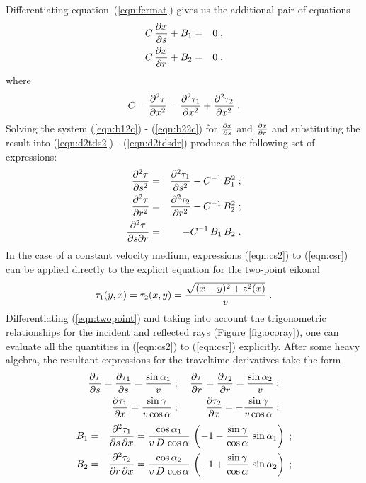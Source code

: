 Differentiating equation~(\ref{eqn:fermat}) gives us the additional
pair of equations
\begin{eqnarray}
C\,{\partial x \over \partial s}+B_1  & = & 0\;,
\label{eqn:b12c} \\
C\,{\partial x \over \partial r}+B_2  & = & 0\;,
\label{eqn:b22c}
\end{eqnarray}
where
\[
C={\partial^2 \tau \over \partial x^2}=
{\partial^2 \tau_1 \over \partial x^2}+
{\partial^2 \tau_2 \over \partial x^2}\;.
\]
Solving the system (\ref{eqn:b12c}) - (\ref{eqn:b22c}) for $\partial x
\over \partial s$ and $\partial x \over \partial r$ and substituting
the result into (\ref{eqn:d2tds2}) - (\ref{eqn:d2tdsdr}) produces the
following set of expressions:
\begin{eqnarray}
{\partial^2 \tau \over \partial s^2}  & = & 
{\partial^2 \tau_1 \over \partial s^2} -
C^{-1}\,B_1^2\;;
\label{eqn:cs2} \\
{\partial^2 \tau \over \partial r^2}  & = & 
{\partial^2 \tau_2 \over \partial r^2} -
C^{-1}\,B_2^2\;;
\label{eqn:cr2} \\
{\partial^2 \tau \over \partial s \partial r}  & = &  
- C^{-1}\,B_1\,B_2\;.
\label{eqn:csr}
\end{eqnarray}
In the case of a constant velocity medium, expressions (\ref{eqn:cs2}) to
(\ref{eqn:csr}) can be applied directly to the explicit
equation for the two-point eikonal 
\begin{equation}
\tau_1(y,x)=\tau_2(x,y)={\sqrt{(x-y)^2+z^2(x)}\over v}\;.
\label{eqn:twopoint}
\end{equation}
Differentiating (\ref{eqn:twopoint}) and taking into account the trigonometric
relationships for the incident and reflected rays (Figure
\ref{fig:ocoray}), one can 
evaluate all the quantities in (\ref{eqn:cs2}) to (\ref{eqn:csr}) explicitly.
After some heavy algebra, the resultant expressions for the traveltime 
derivatives take the form 
\begin{eqnarray}
{\partial \tau \over \partial s}  = 
{\partial \tau_1 \over \partial s} =
{\sin{\alpha_1}\over v}& \;;\; &
{\partial \tau \over \partial r} =
{\partial \tau_2 \over \partial r} =
{\sin{\alpha_2}\over v}\;;
\label{eqn:tstr} \\
{\partial \tau_1 \over \partial x}  = 
{\sin{\gamma}\over v \cos{\alpha}} & \;;\; &
{\partial \tau_2 \over \partial x} =
- {\sin{\gamma}\over v \cos{\alpha}}\;;
\label{eqn:txx}
\end{eqnarray}
\begin{eqnarray}
B_1  & = & 
{\partial^2 \tau_1 \over \partial s\,\partial x} =
{\cos{\alpha_1}\over{v\,D\,\cos{\alpha}}}\,
\left(-1-{\sin{\gamma}\over\cos{\alpha}}\,\sin{\alpha_1}\right)\;;
\label{eqn:B1} \\ 
B_2  & = &
{\partial^2 \tau_2 \over \partial r\,\partial x} =
{\cos{\alpha_2}\over{v\,D\,\cos{\alpha}}}\,
\left(-1+{\sin{\gamma}\over\cos{\alpha}}\,\sin{\alpha_2}\right)\;;
\label{eqn:B2} 
\end{eqnarray}
